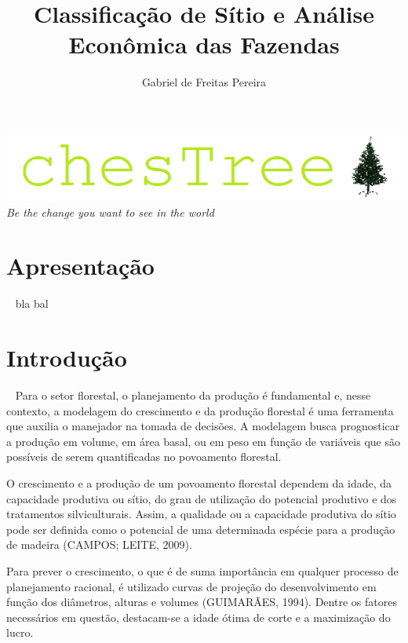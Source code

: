 \documentclass[
  letterpaper,
  DIV=11,
  numbers=noendperiod]{scrartcl}
\title{Classificação de Sítio e Análise Econômica das Fazendas}
\author{Gabriel de Freitas Pereira}
\date{}
\renewcommand*\contentsname{Índice}
\newcommand\contentsname{Índice}
\begin{document}
\maketitle
\ifdefined\Shaded\renewenvironment{Shaded}{\begin{tcolorbox}[borderline west={3pt}{0pt}{shadecolor}, sharp corners, boxrule=0pt, interior hidden, frame hidden, enhanced, breakable]}{\end{tcolorbox}}\fi

\renewcommand*\contentsname{Índice}
{
\hypersetup{linkcolor=}
\setcounter{tocdepth}{3}
\tableofcontents
}
\includegraphics{chestreelogo.png} \center \emph{Be the change you want
to see in the world}

\newpage

\hypertarget{apresentauxe7uxe3o}{%
\section{Apresentação}\label{apresentauxe7uxe3o}}

~ bla bal

\hypertarget{introduuxe7uxe3o}{%
\section{Introdução}\label{introduuxe7uxe3o}}

~ Para o setor florestal, o planejamento da produção é fundamental e,
nesse contexto, a modelagem do crescimento e da produção florestal é uma
ferramenta que auxilia o manejador na tomada de decisões. A modelagem
busca prognosticar a produção em volume, em área basal, ou em peso em
função de variáveis que são possíveis de serem quantificadas no
povoamento florestal.

O crescimento e a produção de um povoamento florestal dependem da idade,
da capacidade produtiva ou sítio, do grau de utilização do potencial
produtivo e dos tratamentos silviculturais. Assim, a qualidade ou a
capacidade produtiva do sítio pode ser definida como o potencial de uma
determinada espécie para a produção de madeira (CAMPOS; LEITE, 2009).

Para prever o crescimento, o que é de suma importância em qualquer
processo de planejamento racional, é utilizado curvas de projeção do
desenvolvimento em função dos diâmetros, alturas e volumes (GUIMARÃES,
1994). Dentre os fatores necessários em questão, destacam-se a idade
ótima de corte e a maximização do lucro.
\end{document}
